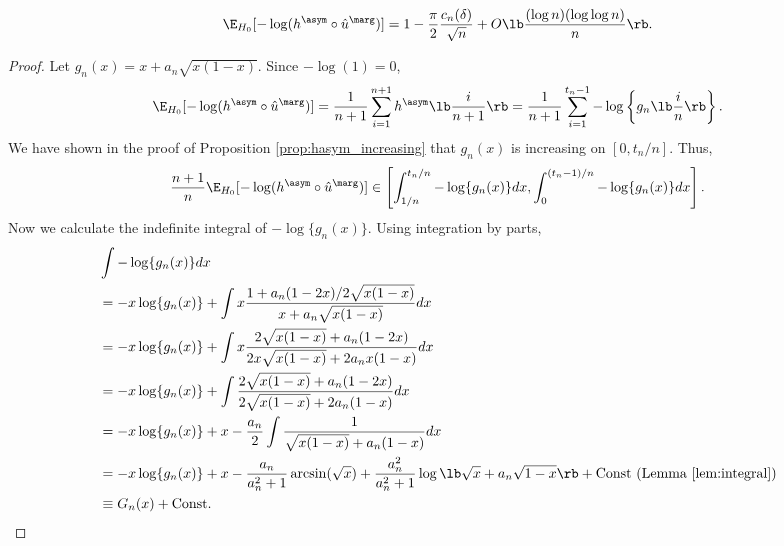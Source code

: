 \begin{thm}\label{thm:fisher_asym}
  \[\E_{H_0}[-\log (h^\asym \circ \hat{u}^\marg)] = 1 - \frac{\pi}{2}\frac{c_n(\delta)}{\sqrt{n}} + O\lb \frac{(\log n)(\log \log n)}{n}\rb.\]
\end{thm}
\begin{proof}
  Let $g_n(x) = x + a_n \sqrt{x(1 - x)}$. Since $-\log(1) = 0$,
  \[\E_{H_0}[-\log (h^\asym \circ \hat{u}^\marg)] = \frac{1}{n+1}\sum_{i=1}^{n+1}h^\asym\lb\frac{i}{n+1}\rb = \frac{1}{n+1}\sum_{i=1}^{t_n - 1} -\log \left\{g_n\lb\frac{i}{n}\rb\right\}.\]
  We have shown in the proof of Proposition \ref{prop:hasym_increasing} that $g_n(x)$ is increasing on $[0, t_n / n]$. Thus,
  \begin{equation}
    \label{eq:integral_bound}
    \frac{n+1}{n}\E_{H_0}[-\log (h^\asym \circ \hat{u}^\marg)]\in \left[\int_{1/n}^{t_n / n}-\log \{g_n(x)\}dx, \int_{0}^{(t_n - 1) / n}-\log \{g_n(x)\}dx\right].
  \end{equation}
  Now we calculate the indefinite integral of $-\log\{g_n(x)\}$. Using integration by parts,
  \begin{align*}
    &\int -\log \{g_n(x)\}dx\\
    &= -x\log \{g_n(x)\} + \int x\frac{1 + a_n (1 - 2x) / 2\sqrt{x(1- x)}}{x + a_n\sqrt{x(1 - x)}}dx\\
    &= -x\log \{g_n(x)\} + \int x\frac{ 2\sqrt{x(1- x)} + a_n (1 - 2x)}{2x\sqrt{x(1- x)} + 2a_n x(1 - x)}dx\\
    & = -x\log \{g_n(x)\} + \int\frac{2\sqrt{x(1 - x)} + a_n (1 - 2x)}{2\sqrt{x(1 - x)} + 2a_n(1 - x)}dx\\
    & = -x\log \{g_n(x)\} + x - \frac{a_n}{2}\int\frac{1}{\sqrt{x(1 - x)} + a_n(1 - x)}dx\\
    & = -x\log \{g_n(x)\} + x - \frac{a_n}{a_n^2 + 1}\arcsin(\sqrt{x}) + \frac{a_n^2}{a_n^2 + 1}\log\lb \sqrt{x} + a_n\sqrt{1 - x}\rb + \mathrm{Const} \,\,\text{(Lemma \ref{lem:integral})}\\
    & \equiv G_n(x) + \mathrm{Const}.
  \end{align*}

\end{proof}
